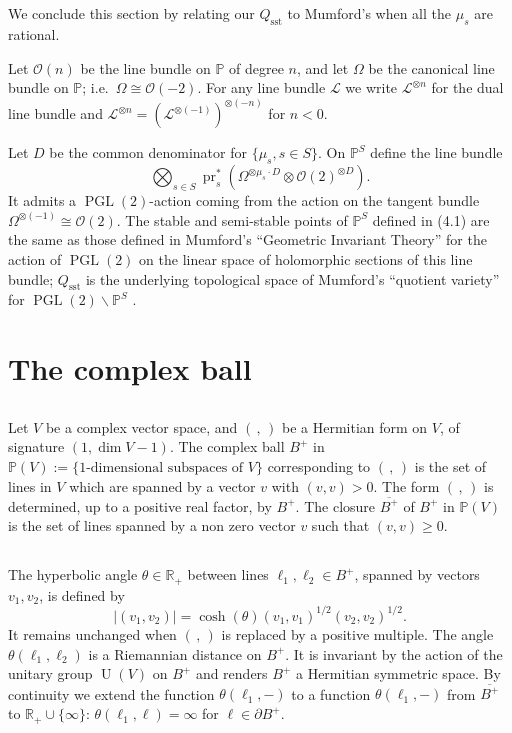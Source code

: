 \documentclass[12pt,a4paper]{article}
\theoremstyle{plain}
\theoremstyle{definition}
\theoremstyle{remark}
\DeclareMathOperator{\PGL}{PGL}
\newcommand{\PP}{\mathbb{P}}
\newcommand{\RR}{\mathbb{R}}
\numberwithin{equation}{section}
\providecommand{\PP}{\mathbb{P}}
\providecommand{\RR}{\mathbb{R}}
\providecommand{\PGL}{\operatorname{PGL}}
\providecommand{\U}{\operatorname{U}}
\providecommand{\pr}{\operatorname{pr}}
\begin{document}
\subsection{}
We conclude this section by relating our $Q_{\mathrm{sst}}$ to Mumford's when all the $\mu_s$ are rational.

Let $\mathcal{O}(n)$ be the line bundle on $\PP$ of degree $n$, and let $\Omega$ be the canonical line bundle on $\PP$; i.e.\ $\Omega \cong \mathcal{O}(-2)$. For any line bundle $\mathscr{L}$ we write $\mathscr{L}^{\otimes n}$ for the dual line bundle and $\mathscr{L}^{\otimes n} = (\mathscr{L}^{\otimes(-1)})^{\otimes(-n)}$ for $n < 0$.

Let $D$ be the common denominator for $\{\mu_s, s \in S\}$. On $\PP^S$ define the line bundle
\[
\bigotimes_{s \in S} \pr_s^*(\Omega^{\otimes \mu_s \cdot D} \otimes \mathcal{O}(2)^{\otimes D}).
\]
It admits a $\PGL(2)$-action coming from the action on the tangent bundle $\Omega^{\otimes(-1)} \cong \mathcal{O}(2)$. The stable and semi-stable points of $\PP^S$ defined in (4.1) are the same as those defined in Mumford's ``Geometric Invariant Theory'' for the action of $\PGL(2)$ on the linear space of holomorphic sections of this line bundle; $Q_{\mathrm{sst}}$ is the underlying topological space of Mumford's ``quotient variety'' for $\PGL(2) \backslash \PP^S$ \cite{Mumford}.


\section{The complex ball}

\subsection{}
Let $V$ be a complex vector space, and $(\,,\,)$ be a Hermitian form on $V$, of signature $(1, \dim V - 1)$. The complex ball $B^+$ in $\PP(V) := \{\text{1-dimensional subspaces of } V\}$ corresponding to $(\,,\,)$ is the set of lines in $V$ which are spanned by a vector $v$ with $(v, v) > 0$. The form $(\,,\,)$ is determined, up to a positive real factor, by $B^+$. The closure $\overline{B^+}$ of $B^+$ in $\PP(V)$ is the set of lines spanned by a non zero vector $v$ such that $(v, v) \geq 0$.

\subsection{}
The hyperbolic angle $\theta \in \RR_+$ between lines $\ell_1, \ell_2 \in B^+$, spanned by vectors $v_1, v_2$, is defined by
\begin{equation}\label{eq:5.2.1}
|(v_1, v_2)| = \cosh(\theta) (v_1, v_1)^{1/2} (v_2, v_2)^{1/2}.
\end{equation}
It remains unchanged when $(\,,\,)$ is replaced by a positive multiple. The angle $\theta(\ell_1, \ell_2)$ is a Riemannian distance on $B^+$. It is invariant by the action of the unitary group $\U(V)$ on $B^+$ and renders $B^+$ a Hermitian symmetric space. By continuity we extend the function $\theta(\ell_1, -)$ to a function $\theta(\ell_1, -)$ from $\overline{B^+}$ to $\RR_+ \cup \{\infty\}$: $\theta(\ell_1, \ell) = \infty$ for $\ell \in \partial B^+$.
\end{document}
